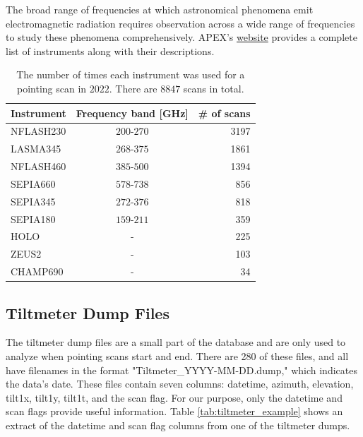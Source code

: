 The broad range of frequencies at which astronomical phenomena emit electromagnetic radiation requires observation across a wide range of frequencies to study these phenomena comprehensively.
APEX's \href{https://www.eso.org/sci/facilities/apex/cfp/cfp110/instrument_summary.html.html}{website} provides a complete list of instruments along with their descriptions.
\begin{table}[H]
    \centering
    \caption[Number of scans for each instrument]{The number of times each instrument was used for a pointing scan in $2022$. There are $8847$ scans in total.}
    \begin{tabular}{lcr}
        \toprule
        Instrument & Frequency band [GHz] &\# of scans \\
        \midrule
        NFLASH230 & $200$-$270$ &3197 \\
        LASMA345  & $268$-$375$ &1861 \\
        NFLASH460 & $385$-$500$ &1394 \\
        SEPIA660  & $578$-$738$ & 856 \\
        SEPIA345  & $272$-$376$ & 818 \\
        SEPIA180  & $159$-$211$ & 359 \\
        HOLO      & - & 225 \\
        ZEUS2     & - & 103 \\
        CHAMP690  & - &  34 \\
        \bottomrule
        \end{tabular}
        \label{tab:instrument_usage}
\end{table}



\subsection{Tiltmeter Dump Files}
The tiltmeter dump files are a small part of the database and are only used to analyze when pointing scans start and end.
There are 280 of these files, and all have filenames in the format "Tiltmeter\_YYYY-MM-DD.dump," which indicates the data's date.
These files contain seven columns: datetime, azimuth, elevation, tilt1x, tilt1y, tilt1t, and the scan flag.
For our purpose, only the datetime and scan flags provide useful information.
Table \ref{tab:tiltmeter_example} shows an extract of the datetime and scan flag columns from one of the tiltmeter dumps.


